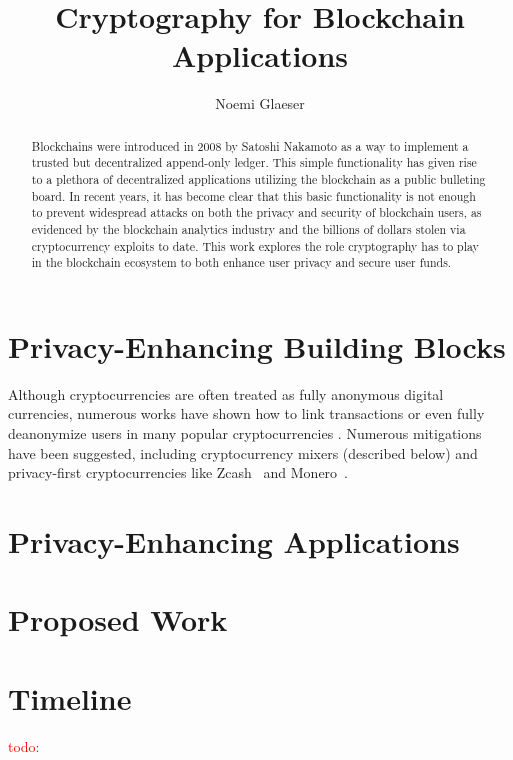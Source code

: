 \documentclass{article}
\title{Cryptography for Blockchain Applications}
\author{Noemi Glaeser}
\date{}
\newcommand{\noemi}[1]{\textcolor{magenta}{Noemi: #1}}
\newcommand{\todo}[1]{\textcolor{red}{todo: #1}}
\begin{document}
\maketitle
\begin{abstract}
Blockchains were introduced in 2008 by Satoshi Nakamoto as a way to implement a trusted but decentralized append-only ledger. This simple functionality has given rise to a plethora of decentralized applications utilizing the blockchain as a public bulleting board. In recent years, it has become clear that this basic functionality is not enough to prevent widespread attacks on both the privacy and security of blockchain users, as evidenced by the blockchain analytics industry and the billions of dollars stolen via cryptocurrency exploits to date. This work explores the role cryptography has to play in the blockchain ecosystem to both enhance user privacy and secure user funds.

\end{abstract}

\tableofcontents



\section{Privacy-Enhancing Building Blocks}\label{sec:building-blocks}

Although cryptocurrencies are often treated as fully anonymous digital currencies, numerous works have shown how to link transactions or even fully deanonymize users in many popular cryptocurrencies \cite{CCS:BirKhoPus14,EuroSP:BirTik19,FC:KosKosMcD14,PoPETS:MSHLHSHHMNC18,USENIX:KYMM18}. Numerous mitigations have been suggested, including cryptocurrency mixers (described below) and privacy-first cryptocurrencies like Zcash~\cite{zcash} and Monero~\cite{monero}. 




\section{Privacy-Enhancing Applications}\label{sec:applications}



\section{Proposed Work}\label{sec:proposed}



\section{Timeline}
\todo{}

{\small


}
\end{document}
